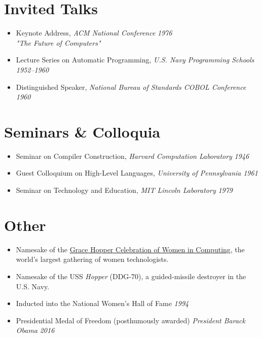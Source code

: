 \documentclass[11pt]{report}
\newcommand{\dates}[1]{\hfill \textit{#1}}
\newcommand{\institution}[1]{\textit{#1}}
\begin{document}
\section{Invited Talks}
\begin{itemize}
\item Keynote Address, \institution{ACM National Conference} \dates{1976} \\
\emph{"The Future of Computers"}
\item Lecture Series on Automatic Programming, \institution{U.S. Navy Programming Schools} \dates{1952--1960}
\item Distinguished Speaker, \institution{National Bureau of Standards COBOL Conference} \dates{1960}
\end{itemize}

\section{Seminars \& Colloquia}
\begin{itemize}
\item Seminar on Compiler Construction, \institution{Harvard Computation Laboratory} \dates{1946}
\item Guest Colloquium on High-Level Languages, \institution{University of Pennsylvania} \dates{1961}
\item Seminar on Technology and Education, \institution{MIT Lincoln Laboratory} \dates{1979}
\end{itemize}

\section{Other}
\begin{itemize}
\item Namesake of the \href{https://ghc.anitab.org/}{Grace Hopper Celebration of Women in Computing}, the world's largest gathering of women technologists.
\item Namesake of the USS \textit{Hopper} (DDG-70), a guided-missile destroyer in the U.S. Navy.
\item Inducted into the National Women’s Hall of Fame \dates{1994}
\item Presidential Medal of Freedom (posthumously awarded) \institution{President Barack Obama} \dates{2016}
\end{itemize}
\end{document}

